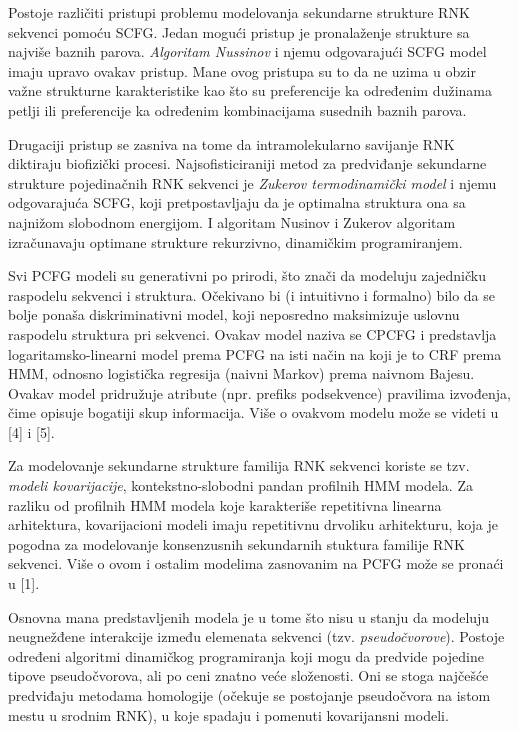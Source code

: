 \documentclass[a4paper, 12pt]{article}
\begin{document}
Postoje različiti pristupi problemu modelovanja sekundarne strukture RNK sekvenci pomoću SCFG. Jedan mogući pristup je pronalaženje strukture sa najviše baznih parova. \textit{Algoritam Nussinov} i njemu odgovarajući SCFG model imaju upravo ovakav pristup. Mane ovog pristupa su to da ne uzima u obzir važne strukturne karakteristike kao što su preferencije ka određenim dužinama petlji ili preferencije ka određenim kombinacijama susednih baznih parova.

Drugaciji pristup se zasniva na tome da intramolekularno savijanje RNK diktiraju biofizički procesi. Najsofisticiraniji metod za predviđanje sekundarne strukture pojedinačnih RNK sekvenci je \textit{Zukerov termodinamički model} i njemu odgovarajuća SCFG, koji pretpostavljaju da je optimalna struktura ona sa najnižom slobodnom energijom. I algoritam Nusinov i Zukerov algoritam izračunavaju optimane strukture rekurzivno, dinamičkim programiranjem.

Svi PCFG modeli su generativni po prirodi, što znači da modeluju zajedničku raspodelu sekvenci i struktura. Očekivano bi (i intuitivno i formalno) bilo da se bolje ponaša diskriminativni model, koji neposredno maksimizuje uslovnu raspodelu struktura pri sekvenci. Ovakav model naziva se CPCFG i predstavlja logaritamsko-linearni model prema PCFG na isti način na koji je to CRF prema HMM, odnosno logistička regresija (naivni Markov) prema naivnom Bajesu. Ovakav model pridružuje atribute (npr. prefiks podsekvence) pravilima izvođenja, čime opisuje bogatiji skup informacija. Više o ovakvom modelu može se videti u [4] i [5].

Za modelovanje sekundarne strukture familija RNK sekvenci koriste se tzv. \textit{modeli kovarijacije}, kontekstno-slobodni pandan profilnih HMM modela. Za razliku od profilnih HMM modela koje karakteriše repetitivna linearna arhitektura, kovarijacioni modeli imaju repetitivnu drvoliku arhitekturu, koja je pogodna za modelovanje konsenzusnih sekundarnih stuktura familije RNK sekvenci. Više o ovom i ostalim modelima zasnovanim na PCFG može se pronaći u [1].

Osnovna mana predstavljenih modela je u tome što nisu u stanju da modeluju neugnežđene interakcije između elemenata sekvenci (tzv. \textit{pseudočvorove}). Postoje određeni algoritmi dinamičkog programiranja koji mogu da predvide pojedine tipove pseudočvorova, ali po ceni znatno veće složenosti. Oni se stoga najčešće predviđaju metodama homologije (očekuje se postojanje pseudočvora na istom mestu u srodnim RNK), u koje spadaju i pomenuti kovarijansni modeli.
\end{document}
